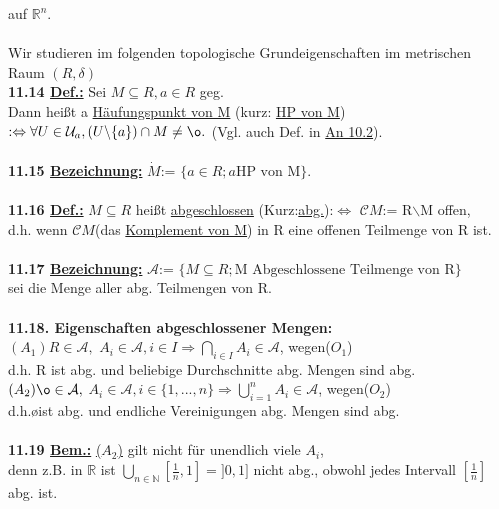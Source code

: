 \documentclass[]{scrartcl}
\begin{document}
 	auf $\mathbb{R}^n$.\\
 	\\
 	Wir studieren im folgenden topologische Grundeigenschaften im metrischen Raum $(R,\delta)$\\
 	\textbf{11.14 \underline{Def.:}} Sei $M\subseteq R, a \in R$ geg.\\
 	Dann heißt a \ul{Häufungspunkt von M} (kurz: \ul{HP von M})\\
 	$:\Leftrightarrow \forall U \in \mathcal{U}_a, (U\backslash\{a\})\cap M\neq \o.$ (Vgl. auch Def. in \ul{An 10.2}).\\
 	\\
 	\textbf{11.15 \underline{Bezeichnung:}} \ul{$\dot{M}$}:= $\{a\in R; a \text{HP von M}\}$.\\
 	\\
 	\textbf{11.16 \underline{Def.:}} $M\subseteq R$ heißt \ul{abgeschlossen} (Kurz:\ul{abg.}):$\Leftrightarrow$ \ul{$\mathcal{C}M$}:= R$\backslash$M offen,\\
 	d.h. wenn $\mathcal{C}M$(das \ul{Komplement von M}) in R eine offenen Teilmenge von R ist.\\
 	\\
 	\textbf{11.17 \underline{Bezeichnung:}} \ul{$\mathcal{A}$}:= $\{M\subseteq R; \text{M Abgeschlossene Teilmenge von R}\}$\\
 	sei die Menge aller abg. Teilmengen von R.\\
 	\\
 	\textbf{11.18. Eigenschaften abgeschlossener Mengen:}\\
 	$(A_1) R\in\mathcal{A},$ \ul{$A_i\in \mathcal{A}, i\in I \Rightarrow\bigcap_{i\in I}A_i \in \mathcal{A}$}, \textopencorner wegen($O_1$)\textcorner\\
 	d.h. R ist abg. und beliebige Durchschnitte abg. Mengen sind abg.\\
 	$(A_2)\o \in \mathcal{A},$ \ul{$A_i \in \mathcal{A},i\in\{1,...,n\}\Rightarrow \bigcup_{i=1}^{n}A_i \in \mathcal{A}$}, \textopencorner wegen($O_2$)\textcorner\\
 	d.h.\o ist abg. und endliche Vereinigungen abg. Mengen sind abg.\\
 	\\
 	\textbf{11.19 \underline{Bem.:}} \ul{($A_2$)} gilt nicht für unendlich viele $A_i$,\\
 	denn z.B. in $\mathbb{R}$ ist $\bigcup_{n\in \mathbb{N}}[\frac{1}{n},1]=]0,1]$ nicht abg., obwohl jedes Intervall $[\frac{1}{n}]$ abg. ist.\\
\end{document}
